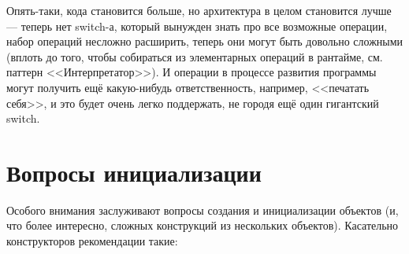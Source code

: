 \documentclass[a5paper]{article}
\begin{document}
Опять-таки, кода становится больше, но архитектура в целом становится лучше --- теперь нет switch-а, который вынужден знать про все возможные операции, набор операций несложно расширить, теперь они могут быть довольно сложными (вплоть до того, чтобы собираться из элементарных операций в рантайме, см. паттерн <<Интерпретатор>>). И операции в процессе развития программы могут получить ещё какую-нибудь ответственность, например, <<печатать себя>>, и это будет очень легко поддержать, не городя ещё один гигантский switch.

\section{Вопросы инициализации}

Особого внимания заслуживают вопросы создания и инициализации объектов (и, что более интересно, сложных конструкций из нескольких объектов). Касательно конструкторов рекомендации такие:
\end{document}
